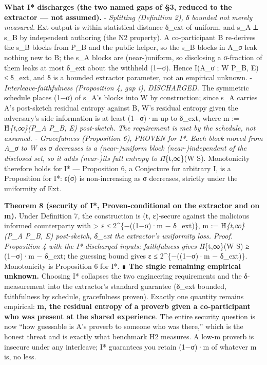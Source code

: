 \documentclass[
  11pt,
]{article}
\begin{document}
\textbf{What I* discharges (the two named gaps of §3, reduced to the
extractor --- not assumed).} - \emph{Splitting (Definition 2), δ bounded
not merely measured.} Ext output is within statistical distance δ\_ext
of uniform, and s\_A ⟂ s\_B by independent authoring (the N2 property).
A co-participant B re-derives the s\_B blocks from P\_B and the public
helper, so the s\_B blocks in A\_σ leak nothing new to B; the s\_A
blocks are (near-)uniform, so disclosing a σ-fraction of them leaks at
most δ\_ext about the withheld (1−σ). Hence I(A\_σ ; W \textbar{} P\_B,
E) ≤ δ\_ext, and δ is a bounded extractor parameter, not an empirical
unknown. - \emph{Interleave-faithfulness (Proposition 4, gap i),
DISCHARGED.} The symmetric schedule places (1−σ) of s\_A's blocks into W
by construction; since s\_A carries A's post-sketch residual entropy
against B, W's residual entropy given the adversary's side information
is at least (1−σ)·m up to δ\_ext, where m := H̃\emph{\{t,∞\}(P\_A
\textbar{} P\_B, E) post-sketch. The requirement is met by the schedule,
not assumed. - \emph{Gracefulness (Proposition 6), PROVEN for I*.} Each
block moved from A\_σ to W as σ decreases is a (near-)uniform block
(near-)independent of the disclosed set, so it adds (near-)its full
entropy to H̃}\{t,∞\}(W \textbar{} S). Monotonicity therefore holds for
I* --- Proposition 6, a Conjecture for arbitrary I, is a Proposition for
I*: ε(σ) is non-increasing as σ decreases, strictly under the uniformity
of Ext.

\textbf{Theorem 8 (security of I*, Proven-conditional on the extractor
and on m).} Under Definition 7, the construction is (t, ε)-secure
against the malicious informed counterparty with \textgreater{} ε ≤
2\^{}\{−((1−σ)·m − δ\_ext)\}, m := H̃\emph{\{t,∞\}(P\_A \textbar{} P\_B,
E) post-sketch, δ\_ext the extractor's uniformity loss. \emph{Proof.}
Proposition 4 with the I*-discharged inputs: faithfulness gives
H̃}\{t,∞\}(W \textbar{} S) ≥ (1−σ)·m − δ\_ext; the guessing bound gives ε
≤ 2\^{}\{−((1−σ)·m − δ\_ext)\}. Monotonicity is Proposition 6 for I*. ∎
\textbf{The single remaining empirical unknown.} Choosing I* collapses
the two engineering requirements and the δ-measurement into the
extractor's standard guarantee (δ\_ext bounded, faithfulness by
schedule, gracefulness proven). Exactly one quantity remains empirical:
\textbf{m, the residual entropy of a proverb given a co-participant who
was present at the shared experience}. The entire security question is
now ``how guessable is A's proverb to someone who was there,'' which is
the honest threat and is exactly what benchmark H2 measures. A low-m
proverb is insecure under any interleave; I* guarantees you retain
(1−σ)·m of whatever m is, no less.
\end{document}
